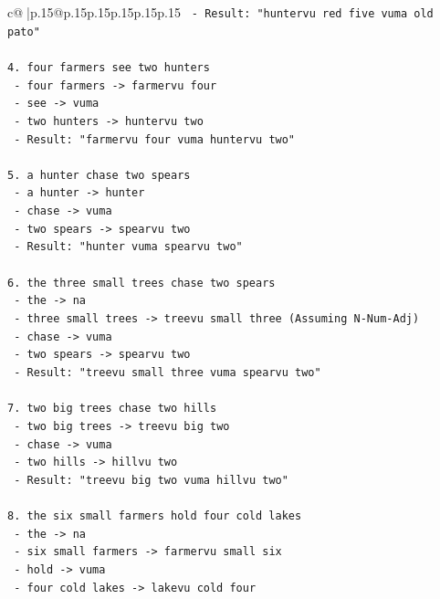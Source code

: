 \documentclass{article}
\begin{document}
{\begin{supertabular}{c@{$\;$}|p{.15\linewidth}@{}p{.15\linewidth}p{.15\linewidth}p{.15\linewidth}p{.15\linewidth}p{.15\linewidth}}
{{{\texttt{   {-} Result: "huntervu red five vuma old pato"} \\
\\ 
\texttt{4. four farmers see two hunters} \\
\texttt{   {-} four farmers {-}> farmervu four} \\
\texttt{   {-} see {-}> vuma} \\
\texttt{   {-} two hunters {-}> huntervu two} \\
\texttt{   {-} Result: "farmervu four vuma huntervu two"} \\
\\ 
\texttt{5. a hunter chase two spears} \\
\texttt{   {-} a hunter {-}> hunter} \\
\texttt{   {-} chase {-}> vuma} \\
\texttt{   {-} two spears {-}> spearvu two} \\
\texttt{   {-} Result: "hunter vuma spearvu two"} \\
\\ 
\texttt{6. the three small trees chase two spears} \\
\texttt{   {-} the {-}> na} \\
\texttt{   {-} three small trees {-}> treevu small three (Assuming N{-}Num{-}Adj)} \\
\texttt{   {-} chase {-}> vuma} \\
\texttt{   {-} two spears {-}> spearvu two} \\
\texttt{   {-} Result: "treevu small three vuma spearvu two"} \\
\\ 
\texttt{7. two big trees chase two hills} \\
\texttt{   {-} two big trees {-}> treevu big two} \\
\texttt{   {-} chase {-}> vuma} \\
\texttt{   {-} two hills {-}> hillvu two} \\
\texttt{   {-} Result: "treevu big two vuma hillvu two"} \\
\\ 
\texttt{8. the six small farmers hold four cold lakes} \\
\texttt{   {-} the {-}> na} \\
\texttt{   {-} six small farmers {-}> farmervu small six} \\
\texttt{   {-} hold {-}> vuma} \\
\texttt{   {-} four cold lakes {-}> lakevu cold four} \\
}}}
\end{supertabular}}
\end{document}
